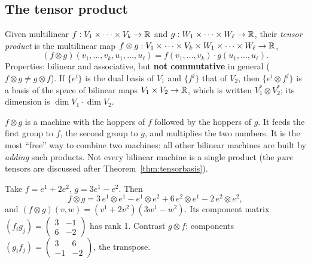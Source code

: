 \subsection{The tensor product}\label{sec:tensorproduct}
\begin{formal}
Given multilinear $f:V_1\times\dots\times V_k\to\mathbb{R}$ and $g:W_1\times\dots\times W_\ell\to\mathbb{R}$, their \emph{tensor product} is the multilinear map $f\otimes g:V_1\times\dots\times V_k\times W_1\times\dots\times W_\ell\to\mathbb{R}$,
\[
(f\otimes g)(v_1,\dots,v_k,u_1,\dots,u_\ell)=f(v_1,\dots,v_k)\cdot g(u_1,\dots,u_\ell).
\]
Properties: bilinear and associative, but \textbf{not commutative} in general ($f\otimes g\ne g\otimes f$). If $\{e^{i}\}$ is the dual basis of $V_1$ and $\{f^{j}\}$ that of $V_2$, then $\{e^{i}\otimes f^{j}\}$ is a basis of the space of bilinear maps $V_1\times V_2\to\mathbb{R}$, which is written $V_1^*\otimes V_2^*$; its dimension is $\dim V_1\cdot\dim V_2$.
\end{formal}

\begin{intuition}
$f\otimes g$ is a machine with the hoppers of $f$ followed by the hoppers of $g$. It feeds the first group to $f$, the second group to $g$, and multiplies the two numbers. It is the most ``free'' way to combine two machines: all other bilinear machines are built by \emph{adding} such products. Not every bilinear machine is a single product (the \emph{pure} tensors are discussed after Theorem~\ref{thm:tensorbasis}).
\end{intuition}

\begin{example}
Take $f=e^{1}+2e^{2}$, $g=3e^{1}-e^{2}$. Then
\[
f\otimes g=3\,e^{1}\!\otimes e^{1}-e^{1}\!\otimes e^{2}+6\,e^{2}\!\otimes e^{1}-2\,e^{2}\!\otimes e^{2},
\]
and $(f\otimes g)(v,w)=(v^1+2v^2)(3w^1-w^2)$. Its component matrix $(f_ig_j)=\begin{pmatrix}3&-1\\6&-2\end{pmatrix}$ has rank 1. Contrast $g\otimes f$: components $(g_if_j)=\begin{pmatrix}3&6\\-1&-2\end{pmatrix}$, the transpose.
\end{example}


